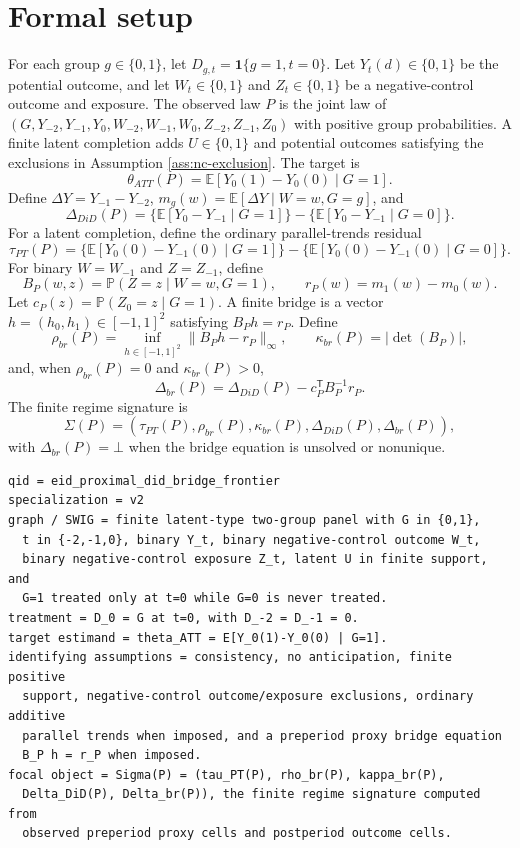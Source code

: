 \documentclass[11pt]{article}
\newcommand{\E}{\mathbb{E}}
\renewcommand{\Pr}{\mathbb{P}}
\newcommand{\one}{\mathbf{1}}
\newcommand{\transpose}{\mathsf{T}}
\theoremstyle{definition}
\theoremstyle{plain}
\theoremstyle{remark}
\begin{document}
\section{Formal setup}
For each group \(g\in\{0,1\}\), let \(D_{g,t}=\one\{g=1,t=0\}\). Let \(Y_t(d)\in\{0,1\}\) be the potential outcome, and let \(W_t\in\{0,1\}\) and \(Z_t\in\{0,1\}\) be a negative-control outcome and exposure. The observed law \(P\) is the joint law of \((G,Y_{-2},Y_{-1},Y_0,W_{-2},W_{-1},W_0,Z_{-2},Z_{-1},Z_0)\) with positive group probabilities. A finite latent completion adds \(U\in\{0,1\}\) and potential outcomes satisfying the exclusions in Assumption \ref{ass:nc-exclusion}. The target is
\[
\theta_{ATT}(P)=\E[Y_0(1)-Y_0(0)\mid G=1].
\]
Define \(\Delta Y=Y_{-1}-Y_{-2}\), \(m_g(w)=\E[\Delta Y\mid W=w,G=g]\), and
\[
\Delta_{DiD}(P)=\{\E[Y_0-Y_{-1}\mid G=1]\}-\{\E[Y_0-Y_{-1}\mid G=0]\}.
\]
For a latent completion, define the ordinary parallel-trends residual
\[
\tau_{PT}(P)=\{ \E[Y_0(0)-Y_{-1}(0)\mid G=1]\}-\{\E[Y_0(0)-Y_{-1}(0)\mid G=0]\}.
\]
For binary \(W=W_{-1}\) and \(Z=Z_{-1}\), define
\[
B_P(w,z)=\Pr(Z=z\mid W=w,G=1),\qquad r_P(w)=m_1(w)-m_0(w).
\]
Let \(c_P(z)=\Pr(Z_0=z\mid G=1)\). A finite bridge is a vector \(h=(h_0,h_1)\in[-1,1]^2\) satisfying \(B_P h=r_P\). Define
\[
\rho_{br}(P)=\inf_{h\in[-1,1]^2}\|B_P h-r_P\|_\infty,\qquad \kappa_{br}(P)=|\det(B_P)|,
\]
and, when \(\rho_{br}(P)=0\) and \(\kappa_{br}(P)>0\),
\[
\Delta_{br}(P)=\Delta_{DiD}(P)-c_P^\transpose B_P^{-1}r_P.
\]
The finite regime signature is
\[
\Sigma(P)=\left(\tau_{PT}(P),\rho_{br}(P),\kappa_{br}(P),\Delta_{DiD}(P),\Delta_{br}(P)\right),
\]
with \(\Delta_{br}(P)=\bot\) when the bridge equation is unsolved or nonunique.
\begin{verbatim}
qid = eid_proximal_did_bridge_frontier
specialization = v2
graph / SWIG = finite latent-type two-group panel with G in {0,1},
  t in {-2,-1,0}, binary Y_t, binary negative-control outcome W_t,
  binary negative-control exposure Z_t, latent U in finite support, and
  G=1 treated only at t=0 while G=0 is never treated.
treatment = D_0 = G at t=0, with D_-2 = D_-1 = 0.
target estimand = theta_ATT = E[Y_0(1)-Y_0(0) | G=1].
identifying assumptions = consistency, no anticipation, finite positive
  support, negative-control outcome/exposure exclusions, ordinary additive
  parallel trends when imposed, and a preperiod proxy bridge equation
  B_P h = r_P when imposed.
focal object = Sigma(P) = (tau_PT(P), rho_br(P), kappa_br(P),
  Delta_DiD(P), Delta_br(P)), the finite regime signature computed from
  observed preperiod proxy cells and postperiod outcome cells.
\end{verbatim}
\end{document}
